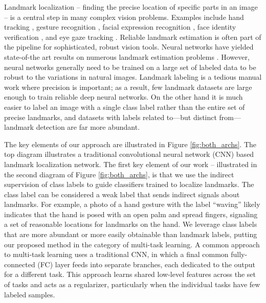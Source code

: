 \documentclass[10pt,twocolumn,letterpaper]{article}
\begin{document}
Landmark localization -- finding the precise location of specific parts in an image -- is a central step in many complex vision problems. Examples include hand tracking \cite{hu2010hand, datcu2013free},  gesture recognition \cite{dardas2010hand}, facial expression recognition \cite{kahou2013combining}, face identity verification \cite{taigman2014deepface, sun2014deep}, and eye gaze tracking \cite{zhang2015appearance, mora2012gaze}. 
Reliable landmark estimation %
is often part of the pipeline for sophisticated, robust vision tools.
Neural networks have yielded state-of-the art results on numerous landmark estimation problems \cite{tompson2015efficient, honari2016recombinator, xiao2016robust, yu2016deep, wang2016recurrent}. 
However, neural networks generally need to be trained on a large set of labeled data to be robust to the variations in natural images. Landmark labeling is a tedious manual work where precision is important; as a result, few landmark datasets are large enough to train reliable deep neural networks. On the other hand it is much easier to label an image with a single class label rather than the entire set of precise landmarks, and datasets with labels related to---but distinct from---landmark detection are far more abundant.

The key elements of our approach are illustrated in Figure \ref{fig:both_archs}. The top diagram illustrates a traditional convolutional neural network (CNN) based landmark localization network.
The first key element of our work -- illustrated in the second diagram of Figure \ref{fig:both_archs}, is that we use the indirect supervision of class labels to guide classifiers trained to localize landmarks. The class label can be considered a weak label that sends indirect signals about landmarks. For example, a photo of a hand gesture with the label ``waving'' likely indicates that the hand is posed with an open palm and spread fingers, signaling a set of reasonable locations for landmarks on the hand. We leverage class labels that are more abundant or more easily obtainable than landmark labels, putting our proposed method in the category of multi-task learning. A common approach \cite{zhang2014facialMTFL, zhang2016MAFL, zhang2014improving, devries2014multi} to multi-task learning uses a traditional CNN, in which a final common fully-connected (FC) layer feeds into separate branches, each dedicated to the output for a different task. This approach learns shared low-level features across the set of tasks and acts as a regularizer, particularly when the individual tasks have few labeled samples.
\end{document}
